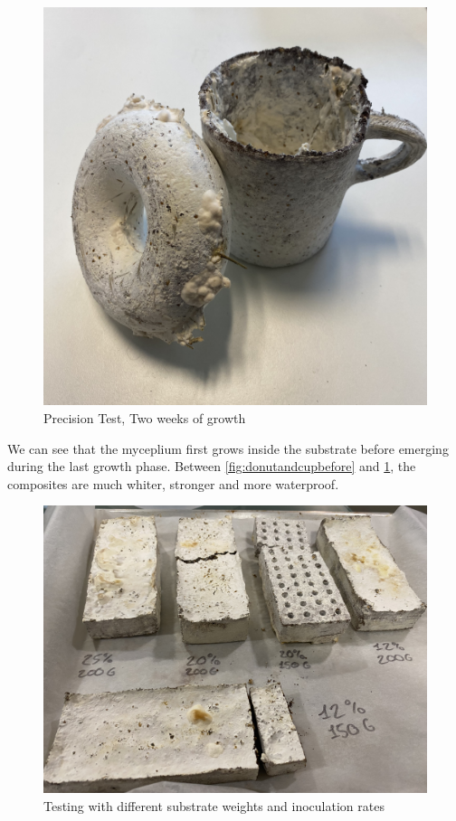 \begin{figure}[h]
    \centering
    \includegraphics{images/IMG_1838.JPG}
    \caption{Precision Test, Two weeks of growth}
    \label{fig:donutandcup}
\end{figure} 

We can see that the myceplium first grows inside the substrate before emerging during the last growth phase. Between \ref{fig:donutandcupbefore} and  \ref{fig:donutandcup}, the composites are much whiter, stronger and more waterproof. 

\begin{figure}[h]
    \centering
    \includegraphics{images/IMG_3228.jpg}
    \caption{Testing with different substrate weights and inoculation rates} 
    \label{fig:ratesubstrate}
\end{figure} 

